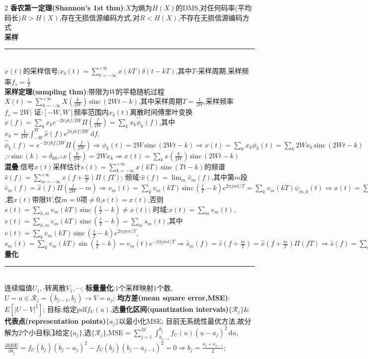 \documentclass[UTF8,a4paper,10pt]{article}
\providecommand{\abs}[1]{\left\lvert#1\right\rvert}
\providecommand{\sinc}{\,\mathrm{sinc}\,}
\begin{document}
\begin{multicols*}{2}
\textbf{香农第一定理(Shannon's 1st thm)}:$X$为熵为$H(X)$的DMS,对任何码率(平均码长)$R>H(X)$,存在无损信源编码方式,对$R<H(X)$,不存在无损信源编码方式\\
\textbf{采样}\rule{\columnwidth-}{.2pt}\\
$x(t)$的采样信号:$x_{\delta}(t)=\sum_{k=-\infty}^{+\infty}x(kT)\delta(t-kT)$,其中$T$-采样周期,采样频率$f_s=\frac{1}{T}$\\
\textbf{采样定理(sampling thm)}:带限为$W$的平稳随机过程$X(t)=\sum_{k=-\infty}^{+\infty}X(\frac{k}{2W})\sinc(2Wt-k)$,其中采样周期$T=\frac{1}{2W}$,采样频率$f_s=2W$;%
    证:$[-W,W]$频率范围内$x_{\delta}(t)$离散时间傅里叶变换$\hat{x}(f)=\sum_kx_ke^{-2\pi jkf/2W}\Pi(\frac{f}{2W})=\sum_kx_k\hat{\phi}_k(f)$,其中$x_k=\frac{1}{2W}\int_{-W}^W\hat{x}(f)e^{2\pi jkf/2W}\,\mathrm{d}f$,$\hat{\phi}_k(f)=e^{-2\pi jkf/2W}\Pi(\frac{f}{2W})\Rightarrow\phi_k(t)=2W\sinc(2Wt-k)\Rightarrow x(t)=\sum_kx_k\phi_k(t)=\sum_k2Wx_k\sinc(2Wt-k)$,$\because\sinc(k)=\delta_{k0}$,$\therefore x(\frac{k}{2W})=2Wx_k\Rightarrow x(t)=\sum_kx(\frac{k}{2W})\sinc(2Wt-k)$\\
\textbf{混叠}:信号$x(t)$采样估计$s(t)=\sum_{k=-\infty}^{+\infty}x(kT)\sinc(Tt-k)$的频谱$\hat{s}(f)=\sum_{m=-\infty}^{+\infty}\hat{x}(f+\frac{m}{T})\Pi(fT)$;%
    频域:$\hat{x}(f)=\lim_m\hat{v}_m(f)$,其中第$m$段$\hat{v}_m(f)=\hat{x}(f)\Pi(\frac{f}{2W}-m)\Rightarrow v_m(t)=\sum_kv_m(kT)\sinc(\frac{t}{T}-k)e^{2\pi jmt/T}=\sum_kv_m(kT)\psi_{m,k}(t)\Rightarrow x(t)=\sum_{m,k}v_m(kT)\sinc(\frac{t}{T}-k)e^{2\pi jmt/T}$,若$x(t)$带限$W$,仅$m=0$项$\neq 0$,$s(t)=x(t)$,否则$s(t)=\sum_{k,m}v_m(kT)\sinc(\frac{t}{T}-k)\neq x(t)$;%
    时域:$x(t)=\sum_mv_m(t)$,$s(t)=\sum_{k,m}v_m(kT)\sinc(\frac{t}{T}-k)=\sum_ms_m(t)$,其中$v(t)=\sum_kv_m(kT)\sinc(\frac{t}{T}-k)e^{2\pi jmt/T}$,$s_m(t)=\sum_kv_m(kT)\sin(\frac{t}{T}-k)=v_m(t)e^{-2\pi jmt/T}\Rightarrow\hat{s}_m(f)=\hat{v}(f+\frac{m}{T})=\hat{x}(f+\frac{m}{T})\Pi(fT)\Rightarrow\hat{s}(f)=\sum_m\hat{x}(f+\frac{m}{T})\Pi(fT)$\\
\textbf{量化}\rule{\columnwidth-}{.2pt}\\
连续幅值$U_1,\cdot$转离散$V_1,\cdots$;%
    \textbf{标量量化}:$1$个采样映射$1$个数,$U=u\in\mathcal{R}_j=(b_{j-1},b_j)\rightarrow V=a_j$;%
    \textbf{均方差(mean square error,MSE)}:$E[\abs{U-V}^2]$;%
    目标:给定pdf$f_U(u)$,选\textbf{量化区间(quantization intervals)}$\{\mathcal{R}_j\}$\&\textbf{代表点(representation points)}$\{a_j\}$以最小化MSE;%
    目前无系统性最优方法,故分解为$2$个小目标:\textcircled{1}给定$\{a_j\}$,选$\{\mathcal{R}_j\}$,MSE$=\sum_{j=1}^M\int_{b_{j-1}}^{b_j}f_U(u)(u-a_j)^2\,\mathrm{d}u$,$\frac{\partial\text{MSE}}{\partial b_j}=f_U(b_j)(b_j-a_j)^2-f_U(b_j)(b_j-a_{j-1})^2=0\Rightarrow b_j=\frac{a_j+a_{j-1}}{2}$;%

\end{multicols*}
\end{document}
